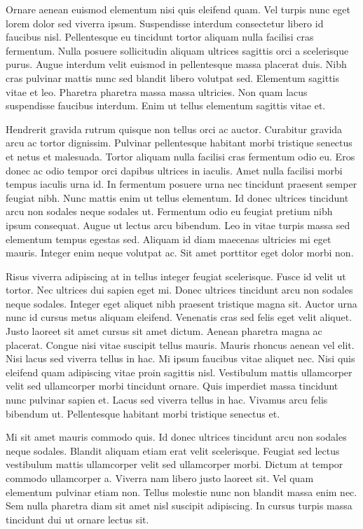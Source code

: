 \documentclass[a4paper,12pt,oneside]{article}
\begin{document}
Ornare aenean euismod elementum nisi quis eleifend quam. Vel turpis nunc eget lorem dolor sed viverra ipsum. Suspendisse interdum consectetur libero id faucibus nisl. Pellentesque eu tincidunt tortor aliquam nulla facilisi cras fermentum. Nulla posuere sollicitudin aliquam ultrices sagittis orci a scelerisque purus. Augue interdum velit euismod in pellentesque massa placerat duis. Nibh cras pulvinar mattis nunc sed blandit libero volutpat sed. Elementum sagittis vitae et leo. Pharetra pharetra massa massa ultricies. Non quam lacus suspendisse faucibus interdum. Enim ut tellus elementum sagittis vitae et.

Hendrerit gravida rutrum quisque non tellus orci ac auctor. Curabitur gravida arcu ac tortor dignissim. Pulvinar pellentesque habitant morbi tristique senectus et netus et malesuada. Tortor aliquam nulla facilisi cras fermentum odio eu. Eros donec ac odio tempor orci dapibus ultrices in iaculis. Amet nulla facilisi morbi tempus iaculis urna id. In fermentum posuere urna nec tincidunt praesent semper feugiat nibh. Nunc mattis enim ut tellus elementum. Id donec ultrices tincidunt arcu non sodales neque sodales ut. Fermentum odio eu feugiat pretium nibh ipsum consequat. Augue ut lectus arcu bibendum. Leo in vitae turpis massa sed elementum tempus egestas sed. Aliquam id diam maecenas ultricies mi eget mauris. Integer enim neque volutpat ac. Sit amet porttitor eget dolor morbi non.

Risus viverra adipiscing at in tellus integer feugiat scelerisque. Fusce id velit ut tortor. Nec ultrices dui sapien eget mi. Donec ultrices tincidunt arcu non sodales neque sodales. Integer eget aliquet nibh praesent tristique magna sit. Auctor urna nunc id cursus metus aliquam eleifend. Venenatis cras sed felis eget velit aliquet. Justo laoreet sit amet cursus sit amet dictum. Aenean pharetra magna ac placerat. Congue nisi vitae suscipit tellus mauris. Mauris rhoncus aenean vel elit. Nisi lacus sed viverra tellus in hac. Mi ipsum faucibus vitae aliquet nec. Nisi quis eleifend quam adipiscing vitae proin sagittis nisl. Vestibulum mattis ullamcorper velit sed ullamcorper morbi tincidunt ornare. Quis imperdiet massa tincidunt nunc pulvinar sapien et. Lacus sed viverra tellus in hac. Vivamus arcu felis bibendum ut. Pellentesque habitant morbi tristique senectus et.

Mi sit amet mauris commodo quis. Id donec ultrices tincidunt arcu non sodales neque sodales. Blandit aliquam etiam erat velit scelerisque. Feugiat sed lectus vestibulum mattis ullamcorper velit sed ullamcorper morbi. Dictum at tempor commodo ullamcorper a. Viverra nam libero justo laoreet sit. Vel quam elementum pulvinar etiam non. Tellus molestie nunc non blandit massa enim nec. Sem nulla pharetra diam sit amet nisl suscipit adipiscing. In cursus turpis massa tincidunt dui ut ornare lectus sit.
\end{document}
